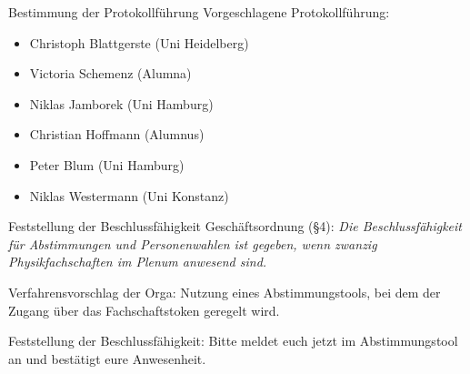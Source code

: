 \documentclass[compress, aspectratio=169]{beamer}
\begin{document}
\begin{frame}{Bestimmung der Protokollführung}
Vorgeschlagene Protokollführung:

\begin{itemize}
\item Christoph Blattgerste (Uni Heidelberg)
\item Victoria Schemenz (Alumna)
\item Niklas Jamborek (Uni Hamburg)
\item Christian Hoffmann (Alumnus)
\item Peter Blum (Uni Hamburg)
\item Niklas Westermann (Uni Konstanz)
\end{itemize}
\end{frame}

\begin{frame}{Feststellung der Beschlussfähigkeit}
Geschäftsordnung (§4): \textit{Die Beschlussfähigkeit für Abstimmungen und Personenwahlen ist gegeben, wenn zwanzig Physikfachschaften im Plenum anwesend sind.}\vspace{.5cm}

Verfahrensvorschlag der Orga: Nutzung eines Abstimmungstools, bei dem der Zugang über das Fachschaftstoken geregelt wird.\vspace{.5cm}

Feststellung der Beschlussfähigkeit: Bitte meldet euch jetzt im Abstimmungstool an und bestätigt eure Anwesenheit.
\end{frame}
\end{document}
